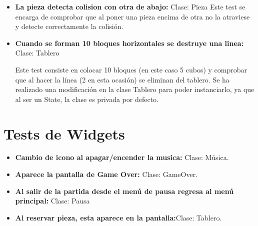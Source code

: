 \documentclass{article}
\begin{document}
\begin{itemize}
\item \textbf{La pieza detecta colision con otra de abajo:} Clase: Pieza
Este test se encarga de comprobar que al poner una pieza encima de otra no la atraviese y detecte correctamente la colisión.
\item \textbf{Cuando se forman 10 bloques horizontales se destruye una linea:} Clase: Tablero

Este test consiste en colocar 10 bloques (en este caso 5 cubos) y comprobar que al hacer la línea (2 en esta ocasión) se eliminan del tablero. Se ha realizado una modificación
en la clase Tablero para poder instanciarlo, ya que al ser un State, la clase es privada por defecto.
\end{itemize}


\section{Tests de Widgets}
\begin{itemize}
\item \textbf{Cambio de icono al apagar/encender la musica:} Clase: Música.

\item \textbf{Aparece la pantalla de Game Over:} Clase: GameOver.

\item \textbf{Al salir de la partida desde el menú de pausa regresa al menú principal:} Clase: Pausa

\item \textbf{Al reservar pieza, esta aparece en la pantalla:}Clase: Tablero.

\end{itemize}
\end{document}
